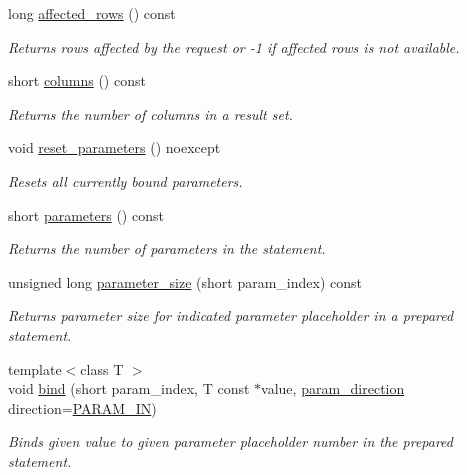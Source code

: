 \begin{DoxyCompactItemize}
long \mbox{\hyperlink{classnanodbc_1_1statement_af904239b45c5a45af262d41cc6441398}{affected\+\_\+rows}} () const
\begin{DoxyCompactList}\small\item\em Returns rows affected by the request or -\/1 if affected rows is not available. \end{DoxyCompactList}\item 
short \mbox{\hyperlink{classnanodbc_1_1statement_a750301a6d2cfa67bc32c766edfc7825c}{columns}} () const
\begin{DoxyCompactList}\small\item\em Returns the number of columns in a result set. \end{DoxyCompactList}\item 
void \mbox{\hyperlink{classnanodbc_1_1statement_ae225c1ec30fb1095f96f207fab2a8793}{reset\+\_\+parameters}} () noexcept
\begin{DoxyCompactList}\small\item\em Resets all currently bound parameters. \end{DoxyCompactList}\item 
short \mbox{\hyperlink{classnanodbc_1_1statement_a7af565aeec0737be62c1a458deddd606}{parameters}} () const
\begin{DoxyCompactList}\small\item\em Returns the number of parameters in the statement. \end{DoxyCompactList}\item 
unsigned long \mbox{\hyperlink{classnanodbc_1_1statement_aef87fd2e1a1b307f212755fdab1dad07}{parameter\+\_\+size}} (short param\+\_\+index) const
\begin{DoxyCompactList}\small\item\em Returns parameter size for indicated parameter placeholder in a prepared statement. \end{DoxyCompactList}\item 
{\footnotesize template$<$class T $>$ }\\void \mbox{\hyperlink{group__binding_gabe1b3e2f93e5b854f6f6a3dfa3250f5c}{bind}} (short param\+\_\+index, T const $\ast$value, \mbox{\hyperlink{classnanodbc_1_1statement_a523142f53cbbee8d68a074da993e7fa6}{param\+\_\+direction}} direction=\mbox{\hyperlink{classnanodbc_1_1statement_a523142f53cbbee8d68a074da993e7fa6ae33f42ce0677d00c291ff4d8e39f99de}{P\+A\+R\+A\+M\+\_\+\+IN}})
\begin{DoxyCompactList}\small\item\em Binds given value to given parameter placeholder number in the prepared statement. \end{DoxyCompactList}\item 

\end{DoxyCompactItemize}
